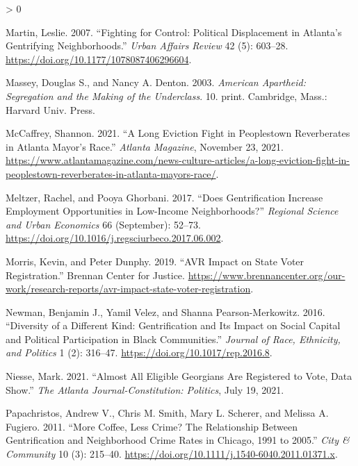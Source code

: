 \documentclass[
  12pt,
]{article}
\newlength{\cslhangindent}
\newenvironment{CSLReferences}[2] %
 {%
  \setlength{\parindent}{0pt}
  \ifodd #1 \everypar{\setlength{\hangindent}{\cslhangindent}}\ignorespaces\fi
  \ifnum #2 > 0
  \setlength{\parskip}{#2\baselineskip}
  \fi
 }%
 {}
\begin{document}
\begin{CSLReferences}{1}{0}
\leavevmode\hypertarget{ref-Martin2007a}{}%
Martin, Leslie. 2007. {``Fighting for {Control}: {Political Displacement} in {Atlanta}'s {Gentrifying Neighborhoods}.''} \emph{Urban Affairs Review} 42 (5): 603--28. \url{https://doi.org/10.1177/1078087406296604}.

\leavevmode\hypertarget{ref-Massey2003}{}%
Massey, Douglas S., and Nancy A. Denton. 2003. \emph{American Apartheid: Segregation and the Making of the Underclass}. 10. print. {Cambridge, Mass.}: {Harvard Univ. Press}.

\leavevmode\hypertarget{ref-McCaffrey2021}{}%
McCaffrey, Shannon. 2021. {``A Long Eviction Fight in {Peoplestown} Reverberates in {Atlanta} Mayor's Race.''} \emph{Atlanta Magazine}, November 23, 2021. \url{https://www.atlantamagazine.com/news-culture-articles/a-long-eviction-fight-in-peoplestown-reverberates-in-atlanta-mayors-race/}.

\leavevmode\hypertarget{ref-Meltzer2017}{}%
Meltzer, Rachel, and Pooya Ghorbani. 2017. {``Does Gentrification Increase Employment Opportunities in Low-Income Neighborhoods?''} \emph{Regional Science and Urban Economics} 66 (September): 52--73. \url{https://doi.org/10.1016/j.regsciurbeco.2017.06.002}.

\leavevmode\hypertarget{ref-Morris2019a}{}%
Morris, Kevin, and Peter Dunphy. 2019. {``{AVR Impact} on {State Voter Registration}.''} {Brennan Center for Justice}. \url{https://www.brennancenter.org/our-work/research-reports/avr-impact-state-voter-registration}.

\leavevmode\hypertarget{ref-Newman2016}{}%
Newman, Benjamin J., Yamil Velez, and Shanna Pearson-Merkowitz. 2016. {``Diversity of a {Different Kind}: {Gentrification} and {Its Impact} on {Social Capital} and {Political Participation} in {Black Communities}.''} \emph{Journal of Race, Ethnicity, and Politics} 1 (2): 316--47. \url{https://doi.org/10.1017/rep.2016.8}.

\leavevmode\hypertarget{ref-Niesse2021a}{}%
Niesse, Mark. 2021. {``Almost All Eligible {Georgians} Are Registered to Vote, Data Show.''} \emph{The Atlanta Journal-Constitution: Politics}, July 19, 2021.

\leavevmode\hypertarget{ref-Papachristos2011}{}%
Papachristos, Andrew V., Chris M. Smith, Mary L. Scherer, and Melissa A. Fugiero. 2011. {``More {Coffee}, {Less Crime}? {The Relationship} Between {Gentrification} and {Neighborhood Crime Rates} in {Chicago}, 1991 to 2005.''} \emph{City \& Community} 10 (3): 215--40. \url{https://doi.org/10.1111/j.1540-6040.2011.01371.x}.


\end{CSLReferences}
\end{document}
